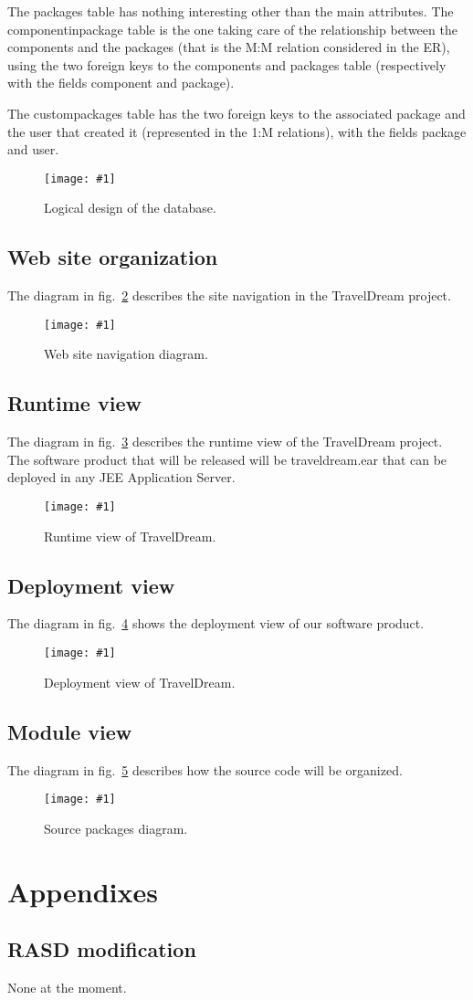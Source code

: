 \documentclass[a4paper,12pt]{book}
\newcommand{\insimg}[3]{
  \begin{figure}[H]
    \begin{center}
      \texttt{[image: \#1]}
    \end{center}
    \caption{#2}
    \label{fig:#1}
  \end{figure}
}
\begin{document}
The packages table has nothing interesting other than the main attributes. The componentinpackage table is the one taking care of the relationship between the components and the packages (that is the M:M relation considered in the ER), using the two foreign keys to the components and packages table (respectively with the fields component and package).\newline

The custompackages table has the two foreign keys to the associated package and the user that created it (represented in the 1:M relations), with the fields package and user.

\insimg{ld-diagram}{Logical design of the database.}{0.5}

\section{Web site organization}
The diagram in fig.~\ref{fig:site-navigation} describes the site navigation in the TravelDream project.

\insimg{site-navigation}{Web site navigation diagram.}{0.4}

\section{Runtime view}
The diagram in fig.~\ref{fig:runtime-view} describes the runtime view of the TravelDream project. The software product that will be released will be traveldream.ear that can be deployed in any JEE Application Server.

\insimg{runtime-view}{Runtime view of TravelDream.}{0.5}

\section{Deployment view}
The diagram in fig.~\ref{fig:deployment-view} shows the deployment view of our software product.

\insimg{deployment-view}{Deployment view of TravelDream.}{0.5}

\section{Module view}
The diagram in fig.~\ref{fig:module-view} describes how the source code will be organized.

\insimg{module-view}{Source packages diagram.}{0.5}

\chapter{Appendixes}

\section{RASD modification}
None at the moment.
\end{document}
